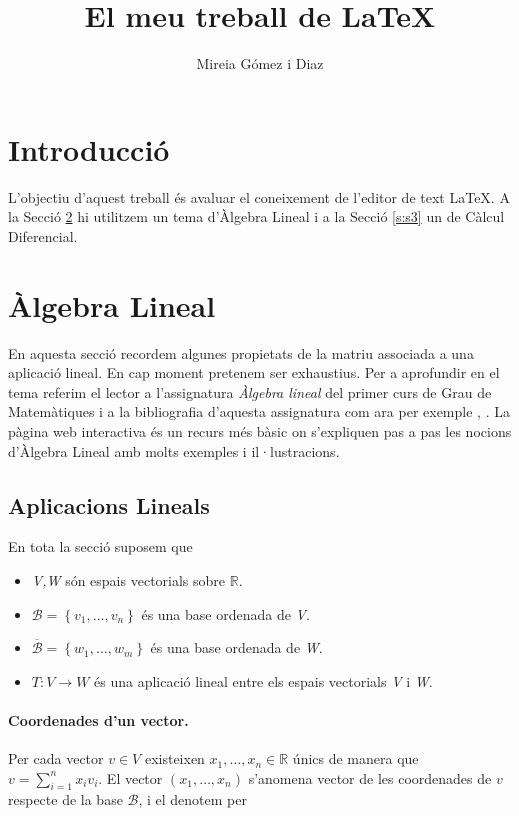 \documentclass[12pt,a4paper]{article}
\title{El meu treball de \LaTeX}
\author{Mireia Gómez i Diaz}
\date{}
\begin{document}
\maketitle
\tableofcontents
\section{Introducció}
L’objectiu d’aquest treball és avaluar el coneixement de l’editor de text \LaTeX. A la Secció \ref{s:s2} hi utilitzem un tema d’Àlgebra Lineal i a la Secció \ref{s:s3} un de Càlcul Diferencial.

\section{Àlgebra Lineal} \label{s:s2}
En aquesta secció recordem algunes propietats de la matriu associada a una aplicació lineal. En cap moment pretenem ser exhaustius. Per a aprofundir en el tema referim el lector a l’assignatura \textit{Àlgebra lineal} del primer curs de Grau de Matemàtiques i a la bibliografia d’aquesta assignatura com ara per exemple \cite{cedo}, \cite{merino}. La pàgina web interactiva \cite{gomez} és un recurs més bàsic on s’expliquen pas a pas les nocions d’Àlgebra Lineal amb molts exemples i il·lustracions.

\subsection{Aplicacions Lineals}
En tota la secció suposem que
\begin{itemize}
\item \textit{V,W} són espais vectorials sobre $\mathbb{R}$.
\item $\mathcal{B}=\left\lbrace v_{1},\ldots, v_{n} \right\rbrace$ és una base ordenada de \textit{V}.
\item $\overline{\mathcal{B}}=\left\lbrace w_{1},\ldots, w_{m} \right\rbrace$ és una base ordenada de \textit{W}.
\item $T: V \rightarrow W$ és una aplicació lineal entre els espais vectorials \textit{V} i \textit{W}.
\end{itemize}

\paragraph{\textbf{Coordenades d'un vector.}} Per cada vector $v \in V$ existeixen $x_{1},\ldots, x_{n} \in \mathbb{R}$ únics de manera que $v=\sum_{i=1}^{n}x_{i}v_{i}$. El vector $(x_{1},\ldots,x_{n})$ s'anomena vector de les coordenades de $v$ respecte de la base $\mathcal{B}$, i el denotem per
\end{document}

